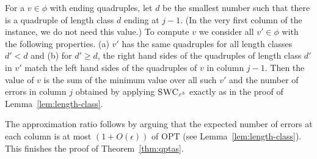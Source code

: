 For a $v \in \phi$ with ending quadruples,
let $d$ be the smallest number such that there is a quadruple of length class $d$ ending at $j-1$. (In the very first column of the instance, we do not need this value.)
To compute $v$ we consider all $v' \in \phi$ with the following properties.
(a) $v'$ has the same quadruples for all length classes $d' < d$ and 
(b) for $d' \ge d$, the right hand sides of the quadruples of length class $d'$ in $v'$ match the left hand sides of the quadruples of $v$ in column $j-1$.
Then the value of $v$ is the sum of the minimum value over all such $v'$ and the number of errors in column $j$ obtained by applying $\textsc{SWC}_{\varepsilon^3}$ exactly as in the proof of Lemma~\ref{lem:length-class}. 
%

The approximation ratio follows 
by
arguing that the expected number of errors at each column is at most $(1+O(\epsilon))$ of OPT
(see Lemma~\ref{lem:length-class}).
This finishes the proof of Theorem~\ref{thm:qptas}.